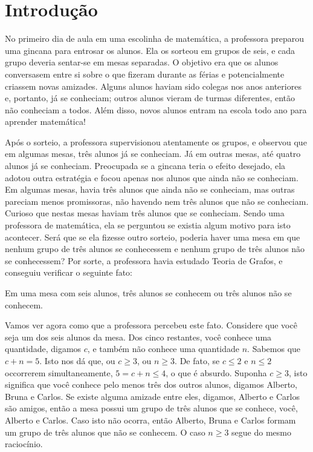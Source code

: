 
\chapter{Introdução}

No primeiro dia de aula em uma escolinha de matemática, a professora preparou uma gincana para entrosar os alunos. Ela os sorteou em grupos de seis, e cada grupo deveria sentar-se em mesas separadas. O objetivo era que os alunos conversasem entre si sobre o que fizeram durante as férias e potencialmente criassem novas amizades. Alguns alunos haviam sido colegas nos anos anteriores e, portanto, já se conheciam; outros alunos vieram de turmas diferentes, então não conheciam a todos. Além disso, novos alunos entram na escola todo ano para aprender matemática!

Após o sorteio, a professora supervisionou atentamente os grupos, e observou que em algumas mesas, três alunos já se conheciam. Já em outras mesas, até quatro alunos já se conheciam. Preocupada se a gincana teria o efeito desejado, ela adotou outra estratégia e focou apenas nos alunos que ainda não se conheciam. Em algumas mesas, havia três alunos que ainda não se conheciam, mas outras pareciam menos promissoras, não havendo nem três alunos que não se conheciam. Curioso que nestas mesas haviam três alunos que se conheciam. Sendo uma professora de matemática, ela se perguntou se existia algum motivo para isto acontecer. Será que se ela fizesse outro sorteio, poderia haver uma mesa em que nenhum grupo de três alunos se conhecessem e nenhum grupo de três alunos não se conhecessem? Por sorte, a professora havia estudado Teoria de Grafos, e conseguiu verificar o seguinte fato:

\begin{fact} \label{fact:ramsey}
Em uma mesa com seis alunos, três alunos se conhecem ou três alunos não se conhecem.
\end{fact}

Vamos ver agora como que a professora percebeu este fato. Considere que você seja um dos seis alunos da mesa. Dos cinco restantes, você conhece uma quantidade, digamos $c$, e também não conhece uma quantidade $n$. Sabemos que $c + n = 5$. Isto nos dá que, ou $c \geq 3$, ou $n \geq 3$. De fato, se $c \leq 2$ e $n \leq 2$ occorrerem simultaneamente, $5 = c + n \leq 4$, o que é absurdo. Suponha $c \geq 3$, isto significa que você conhece pelo menos três dos outros alunos, digamos Alberto, Bruna e Carlos. Se existe alguma amizade entre eles, digamos, Alberto e Carlos são amigos, então a mesa possui um grupo de três alunos que se conhece, você, Alberto e Carlos. Caso isto não ocorra, então Alberto, Bruna e Carlos formam um grupo de três alunos que não se conhecem. O caso $n \geq 3$ segue do mesmo raciocínio.

